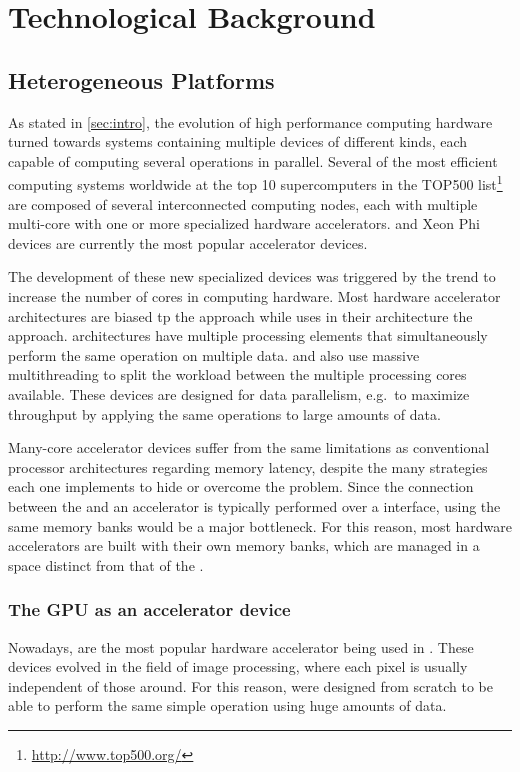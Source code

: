 \section{Technological Background}

\subsection{Heterogeneous Platforms}
As stated in \cref{sec:intro}, the evolution of high performance computing hardware turned towards systems containing multiple devices of different kinds, each capable of computing several operations in parallel. Several of the most efficient computing systems worldwide at the top 10 supercomputers in the TOP500 list\footnote{\url{http://www.top500.org/}} are composed of several interconnected computing nodes, each with multiple multi-core \cpus with one or more specialized hardware accelerators. \gpus and \intel Xeon Phi devices are currently the most popular accelerator devices.

The development of these new specialized devices was triggered by the trend to increase the number of cores in computing hardware. Most hardware accelerator architectures are biased tp the \simd approach while \nvidia uses in their \gpu architecture the \simt approach. \simd architectures have multiple processing elements that simultaneously perform the same operation on multiple data. \mics and \gpus also use massive multithreading to split the workload between the multiple processing cores available. These devices are designed for data parallelism, e.g.\ to maximize throughput by applying the same operations to large amounts of data.

Many-core accelerator devices suffer from the same limitations as conventional processor architectures regarding memory latency, despite the many strategies each one implements to hide or overcome the problem. Since the connection between the \cpu and an accelerator is typically performed over a \pcie interface, using the same memory banks would be a major bottleneck. For this reason, most hardware accelerators are built with their own memory banks, which are managed in a space distinct from that of the \cpu.

\subsubsection{The \acs{GPU} as an accelerator device}
Nowadays, \gpus are the most popular hardware accelerator being used in \hpc. These devices evolved in the field of image processing, where each pixel is usually independent of those around. For this reason, \gpus were designed from scratch to be able to perform the same simple operation using huge amounts of data.

